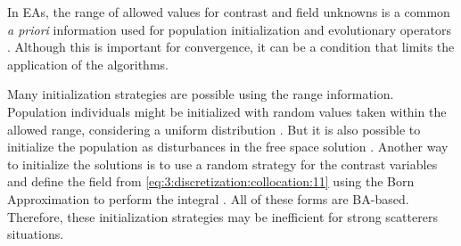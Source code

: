 			In EAs, the range of allowed values for contrast and field unknowns is a common \textit{a priori} information used for population initialization and evolutionary operators \citep{pastorino2000microwave,donelli2005computational,salucci2017multifrequency}. Although this is important for convergence, it can be a condition that limits the application of the algorithms.
			
			Many initialization strategies are possible using the range information. Population individuals might be initialized with random values taken within the allowed range, considering a uniform distribution \citep{pastorino2000microwave,donelli2005computational,salucci2022learned}. But it is also possible to initialize the population as disturbances in the free space solution \citep{donelli2006integrated,donelli2009three}. Another way to initialize the solutions is to use a random strategy for the contrast variables and define the field from \eqref{eq:3:discretization:collocation:11} using the Born Approximation to perform the integral \citep{salucci2017multifrequency}. All of these forms are BA-based. Therefore, these initialization strategies may be inefficient for strong scatterers situations.
			

